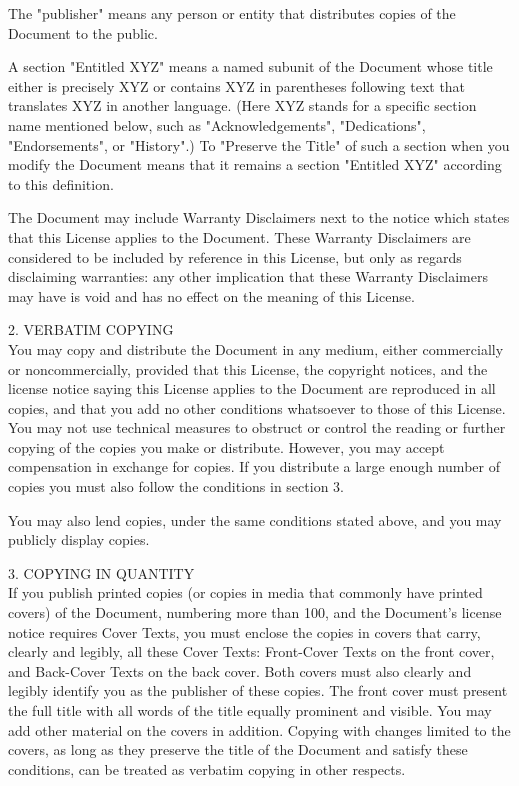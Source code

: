 \documentclass[oneside,12pt]{memoir} %
\begin{document}
The "publisher" means any person or entity that distributes copies of the Document to the public.

A section "Entitled XYZ" means a named subunit of the Document whose title either is precisely XYZ or contains XYZ in parentheses following text that translates XYZ in another language. (Here XYZ stands for a specific section name mentioned below, such as "Acknowledgements", "Dedications", "Endorsements", or "History".) To "Preserve the Title" of such a section when you modify the Document means that it remains a section "Entitled XYZ" according to this definition.

The Document may include Warranty Disclaimers next to the notice which states that this License applies to the Document. These Warranty Disclaimers are considered to be included by reference in this License, but only as regards disclaiming warranties: any other implication that these Warranty Disclaimers may have is void and has no effect on the meaning of this License.

2. VERBATIM COPYING\\

You may copy and distribute the Document in any medium, either commercially or noncommercially, provided that this License, the copyright notices, and the license notice saying this License applies to the Document are reproduced in all copies, and that you add no other conditions whatsoever to those of this License. You may not use technical measures to obstruct or control the reading or further copying of the copies you make or distribute. However, you may accept compensation in exchange for copies. If you distribute a large enough number of copies you must also follow the conditions in section 3.

You may also lend copies, under the same conditions stated above, and you may publicly display copies.

3. COPYING IN QUANTITY\\

If you publish printed copies (or copies in media that commonly have printed covers) of the Document, numbering more than 100, and the Document's license notice requires Cover Texts, you must enclose the copies in covers that carry, clearly and legibly, all these Cover Texts: Front-Cover Texts on the front cover, and Back-Cover Texts on the back cover. Both covers must also clearly and legibly identify you as the publisher of these copies. The front cover must present the full title with all words of the title equally prominent and visible. You may add other material on the covers in addition. Copying with changes limited to the covers, as long as they preserve the title of the Document and satisfy these conditions, can be treated as verbatim copying in other respects.
\end{document}
